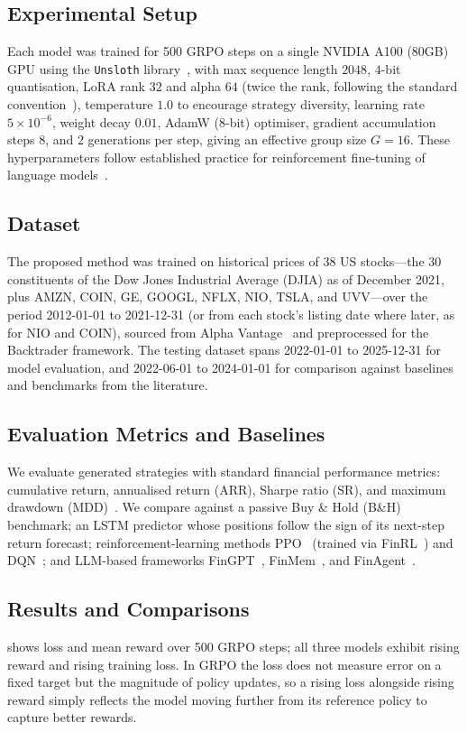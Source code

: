 \documentclass[conference,a4paper]{IEEEtran}
\begin{document}
\subsection{Experimental Setup}
Each model was trained for 500 GRPO steps on a single NVIDIA A100 (80GB) GPU using the
\texttt{Unsloth} library~\cite{unsloth2024}, with max sequence length $2048$, $4$-bit
quantisation, LoRA rank $32$ and alpha $64$ (twice the rank, following the standard
convention~\cite{hu2021lora}), temperature $1.0$ to encourage strategy diversity, learning
rate $5\times 10^{-6}$, weight decay $0.01$, AdamW (8-bit) optimiser, gradient
accumulation steps $8$, and $2$ generations per step, giving an effective group size
$G = 16$. These hyperparameters follow established practice for reinforcement fine-tuning
of language models~\cite{unsloth2024, openai2024rft}.

\subsection{Dataset}
The proposed method was trained on historical prices of 38 US stocks---the 30 constituents
of the Dow Jones Industrial Average (DJIA) as of December 2021, plus AMZN, COIN, GE,
GOOGL, NFLX, NIO, TSLA, and UVV---over the period 2012-01-01 to 2021-12-31 (or from each
stock's listing date where later, as for NIO and COIN), sourced from Alpha
Vantage~\cite{alphavantage2024} and preprocessed for the Backtrader framework. The testing
dataset spans 2022-01-01 to 2025-12-31 for model evaluation, and 2022-06-01 to 2024-01-01
for comparison against baselines and benchmarks from the literature.

\subsection{Evaluation Metrics and Baselines}
\label{sec:baselines}
We evaluate generated strategies with standard financial performance metrics: cumulative
return, annualised return (ARR), Sharpe ratio (SR), and maximum drawdown
(MDD)~\cite{huang2024novel}. We compare against a passive Buy \& Hold (B\&H) benchmark; an
LSTM predictor whose positions follow the sign of its next-step return forecast;
reinforcement-learning methods PPO~\cite{schulman2017ppo} (trained via
FinRL~\cite{liu2021finrl}) and DQN~\cite{mnih2015human}; and LLM-based frameworks
FinGPT~\cite{yang2023fingpt}, FinMem~\cite{yu2023finmem}, and
FinAgent~\cite{zhang2024finagent}.

\subsection{Results and Comparisons}
\label{sec:results}
 shows loss and mean reward over 500 GRPO steps; all three
models exhibit rising reward and rising training loss. In GRPO the loss does not measure
error on a fixed target but the magnitude of policy updates, so a rising loss alongside
rising reward simply reflects the model moving further from its reference policy to
capture better rewards.
\end{document}

